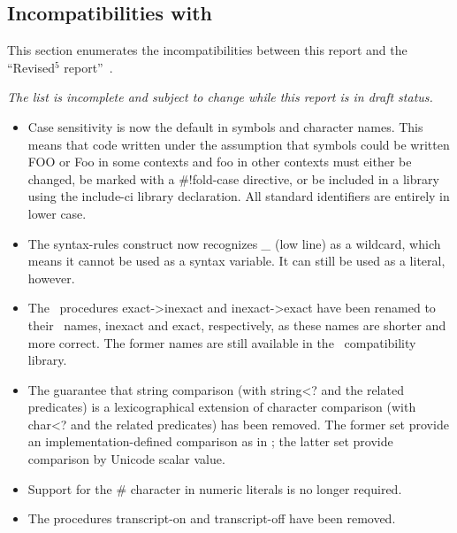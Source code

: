 

\subsection*{Incompatibilities with \rfivers}
\label{incompatibilities}

This section enumerates the incompatibilities between this report and
the ``Revised$^5$ report''~\cite{R5RS}.

{\em The list is incomplete and subject to change while this report is in draft status.}


\begin{itemize}

\item Case sensitivity is now the default in symbols and character names.
This means that code written under the assumption that symbols could be
written {\cf FOO} or {\cf Foo} in some contexts and {\cf foo} in other contexts
must either be changed, be marked with a {\cf \#!fold-case} directive,
or be included in a library using the {\cf include-ci} library declaration.
All standard identifiers are entirely in lower case.

\item The {\cf syntax-rules} construct now recognizes {\em \_} (low line) 
as a wildcard, which means it cannot be used as a syntax variable.
It can still be used as a literal, however.

\item The \rfivers\ procedures {\cf exact->inexact} and {\cf inexact->exact}
have been renamed to their \rsixrs\ names, {\cf inexact} and {\cf exact},
respectively, as these names are shorter and more correct.
The former names are still available in the \rfivers\ compatibility library.

\item The guarantee that string comparison (with {\cf string<?} and the
related predicates) is a lexicographical extension of character comparison
(with {\cf char<?} and the related predicates) has been removed.  The former
set provide an implementation-defined comparison as in \rfivers; the latter
set provide comparison by Unicode scalar value.

\item Support for the \# character in numeric literals is no longer required.

\item The procedures {\cf transcript-on} and {\cf transcript-off} have been removed.

\end{itemize}


